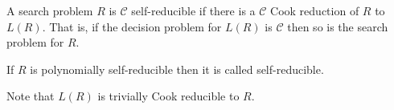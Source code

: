 \documentclass[12pt]{article}
\begin{document}
A search problem $R$ is $\mathcal{C}$ self-reducible if there is a $\mathcal{C}$ Cook reduction of $R$ to $L(R)$.  That is, if the decision problem for $L(R)$ is $\mathcal{C}$ then so is the search problem for $R$.

If $R$ is polynomially self-reducible then it is called self-reducible.

Note that $L(R)$ is trivially Cook reducible to $R$.
\end{document}
